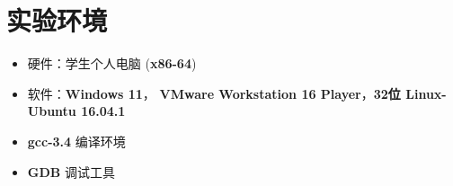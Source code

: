 \section{实验环境}
    \begin{itemize}
        \item 硬件：学生个人电脑 (\textbf{x86-64})
        \item 软件：\textbf{Windows 11}， \textbf{VMware Workstation 16 Player}，\textbf{32位 Linux-Ubuntu 16.04.1}
        \item \textbf{gcc-3.4} 编译环境
        \item \textbf{GDB} 调试工具
    \end{itemize}